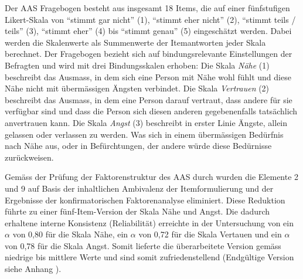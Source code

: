 Der AAS Fragebogen besteht aus insgesamt 18 Items, die auf einer fünfstufigen Likert-Skala von \enquote{stimmt gar nicht} (1), \enquote{stimmt eher nicht} (2), \enquote{stimmt teils / teils} (3), \enquote{stimmt eher} (4) bis \enquote{stimmt genau} (5) eingeschätzt werden. Dabei werden die Skalenwerte als Summenwerte der Itemantworten jeder Skala berechnet. Der Fragebogen bezieht sich auf bindungsrelevante Einstellungen der Befragten und wird mit drei Bindungsskalen erhoben: Die Skala \textit{Nähe} (1) beschreibt das Ausmass, in dem sich eine Person mit Nähe wohl fühlt und diese Nähe nicht mit übermässigen Ängsten verbindet. Die Skala \textit{Vertrauen} (2) beschreibt das Ausmass, in dem eine Person darauf vertraut, dass andere für sie verfügbar sind und dass die Person sich diesen anderen gegebenenfalls tatsächlich anvertrauen kann. Die Skala \textit{Angst} (3) beschreibt in erster Linie Ängste, allein gelassen oder verlassen zu werden. Was sich in einem übermässigen Bedürfnis nach Nähe aus, oder in Befürchtungen, der andere würde diese Bedürnisse zurückweisen. 

Gemäss der Prüfung der Faktorenstruktur des AAS durch  wurden die Elemente 2 und 9 auf Basis der inhaltlichen Ambivalenz der Itemformulierung und der Ergebnisse der konfirmatorischen Faktorenanalyse eliminiert. Diese Reduktion führte zu einer fünf-Item-Version der Skala Nähe und Angst. Die dadurch erhaltene interne Konsistenz (Reliabilität) erreichte in der Untersuchung von  ein $\alpha$ von 0,80 für die Skala Nähe, ein $\alpha$ von 0,72 für die Skala Vertauen und ein $\alpha$ von 0,78 für die Skala Angst. Somit lieferte die überarbeitete Version gemäss  niedrige bis mittlere Werte und sind somit zufriedenstellend (Endgültige Version siehe Anhang ).

